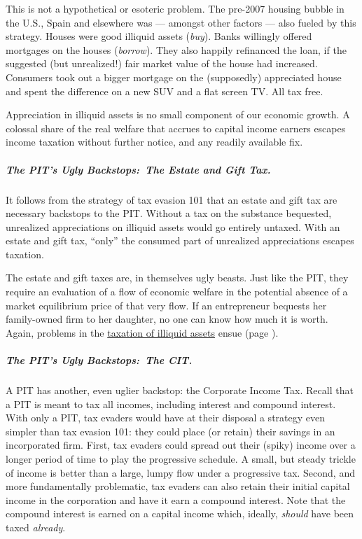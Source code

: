 This is not a hypothetical or esoteric problem.
The pre-2007 housing bubble in the U.S., Spain and elsewhere was --- amongst other factors --- also fueled by this strategy.
Houses were good illiquid assets (\emph{buy}).
Banks willingly offered mortgages on the houses (\emph{borrow}).
They also happily refinanced the loan, if the suggested (but unrealized!) fair market value of the house had increased.
Consumers took out a bigger mortgage on the (supposedly) appreciated house and spent the difference on a new SUV and a flat screen TV.
All tax free.

Appreciation in illiquid assets is no small component of our economic growth.
A colossal share of the real welfare that accrues to capital income earners escapes income taxation without further notice, and any readily available fix.

\subparagraph{The PIT's Ugly Backstops:~The Estate and Gift Tax.}
It follows from the strategy of tax evasion 101 that an estate and gift tax are necessary backstops to the PIT.
Without a tax on the substance bequested, unrealized appreciations on illiquid assets would go entirely untaxed.
With an estate and gift tax, ``only'' the consumed part of unrealized appreciations escapes taxation.

The estate and gift taxes are, in themselves ugly beasts.
Just like the PIT, they require an evaluation of a flow of economic welfare in the potential absence of a market equilibrium price of that very flow.
If an entrepreneur bequests her family-owned firm to her daughter, no one can know how much it is worth.
Again, problems in the \hyperref[sec:Illiquid]{taxation of illiquid assets} ensue (page \pageref{sec:Illiquid}).

\subparagraph{The PIT's Ugly Backstops:~The CIT.}
	\label{sec:ScoreCIT}
A PIT has another, even uglier backstop:
the Corporate Income Tax.
Recall that a PIT is meant to tax all incomes, including interest and compound interest.
With only a PIT, tax evaders would have at their disposal a strategy even simpler than tax evasion 101:
they could place (or retain) their savings in an incorporated firm.
First, tax evaders could spread out their (spiky) income over a longer period of time to play the progressive schedule.
A small, but steady trickle of income is better than a large, lumpy flow under a progressive tax.
Second, and more fundamentally problematic, tax evaders can also retain their initial capital income in the corporation and have it earn a compound interest.
Note that the compound interest is earned on a capital income which, ideally, \emph{should} have been taxed \emph{already}.

